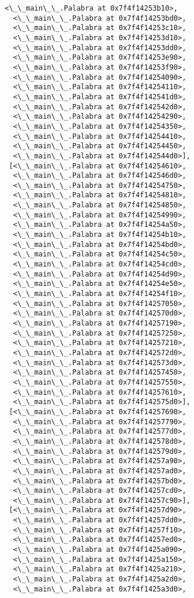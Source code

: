 \documentclass[12pt,a4paper,table]{article}
\begin{document}
\begin{tcolorbox}[breakable, size=fbox, boxrule=.5pt, pad at break*=1mm, opacityfill=0]
\begin{Verbatim}[commandchars=\\\{\}]
  <\_\_main\_\_.Palabra at 0x7f4f14253b10>,
  <\_\_main\_\_.Palabra at 0x7f4f14253bd0>,
  <\_\_main\_\_.Palabra at 0x7f4f14253c10>,
  <\_\_main\_\_.Palabra at 0x7f4f14253d10>,
  <\_\_main\_\_.Palabra at 0x7f4f14253dd0>,
  <\_\_main\_\_.Palabra at 0x7f4f14253e90>,
  <\_\_main\_\_.Palabra at 0x7f4f14253f90>,
  <\_\_main\_\_.Palabra at 0x7f4f14254090>,
  <\_\_main\_\_.Palabra at 0x7f4f14254110>,
  <\_\_main\_\_.Palabra at 0x7f4f142541d0>,
  <\_\_main\_\_.Palabra at 0x7f4f142542d0>,
  <\_\_main\_\_.Palabra at 0x7f4f14254290>,
  <\_\_main\_\_.Palabra at 0x7f4f14254350>,
  <\_\_main\_\_.Palabra at 0x7f4f14254410>,
  <\_\_main\_\_.Palabra at 0x7f4f14254450>,
  <\_\_main\_\_.Palabra at 0x7f4f142544d0>],
 [<\_\_main\_\_.Palabra at 0x7f4f14254610>,
  <\_\_main\_\_.Palabra at 0x7f4f142546d0>,
  <\_\_main\_\_.Palabra at 0x7f4f14254750>,
  <\_\_main\_\_.Palabra at 0x7f4f14254810>,
  <\_\_main\_\_.Palabra at 0x7f4f14254850>,
  <\_\_main\_\_.Palabra at 0x7f4f14254990>,
  <\_\_main\_\_.Palabra at 0x7f4f14254a50>,
  <\_\_main\_\_.Palabra at 0x7f4f14254b10>,
  <\_\_main\_\_.Palabra at 0x7f4f14254bd0>,
  <\_\_main\_\_.Palabra at 0x7f4f14254c50>,
  <\_\_main\_\_.Palabra at 0x7f4f14254cd0>,
  <\_\_main\_\_.Palabra at 0x7f4f14254d90>,
  <\_\_main\_\_.Palabra at 0x7f4f14254e50>,
  <\_\_main\_\_.Palabra at 0x7f4f14254f10>,
  <\_\_main\_\_.Palabra at 0x7f4f14257050>,
  <\_\_main\_\_.Palabra at 0x7f4f142570d0>,
  <\_\_main\_\_.Palabra at 0x7f4f14257190>,
  <\_\_main\_\_.Palabra at 0x7f4f14257250>,
  <\_\_main\_\_.Palabra at 0x7f4f14257210>,
  <\_\_main\_\_.Palabra at 0x7f4f142572d0>,
  <\_\_main\_\_.Palabra at 0x7f4f142573d0>,
  <\_\_main\_\_.Palabra at 0x7f4f14257450>,
  <\_\_main\_\_.Palabra at 0x7f4f14257550>,
  <\_\_main\_\_.Palabra at 0x7f4f14257610>,
  <\_\_main\_\_.Palabra at 0x7f4f142575d0>],
 [<\_\_main\_\_.Palabra at 0x7f4f14257690>,
  <\_\_main\_\_.Palabra at 0x7f4f14257790>,
  <\_\_main\_\_.Palabra at 0x7f4f142577d0>,
  <\_\_main\_\_.Palabra at 0x7f4f142578d0>,
  <\_\_main\_\_.Palabra at 0x7f4f142579d0>,
  <\_\_main\_\_.Palabra at 0x7f4f14257a90>,
  <\_\_main\_\_.Palabra at 0x7f4f14257ad0>,
  <\_\_main\_\_.Palabra at 0x7f4f14257bd0>,
  <\_\_main\_\_.Palabra at 0x7f4f14257cd0>,
  <\_\_main\_\_.Palabra at 0x7f4f14257c90>],
 [<\_\_main\_\_.Palabra at 0x7f4f14257d90>,
  <\_\_main\_\_.Palabra at 0x7f4f14257dd0>,
  <\_\_main\_\_.Palabra at 0x7f4f14257f10>,
  <\_\_main\_\_.Palabra at 0x7f4f14257ed0>,
  <\_\_main\_\_.Palabra at 0x7f4f1425a090>,
  <\_\_main\_\_.Palabra at 0x7f4f1425a150>,
  <\_\_main\_\_.Palabra at 0x7f4f1425a210>,
  <\_\_main\_\_.Palabra at 0x7f4f1425a2d0>,
  <\_\_main\_\_.Palabra at 0x7f4f1425a3d0>,

\end{Verbatim}
\end{tcolorbox}
\end{document}
